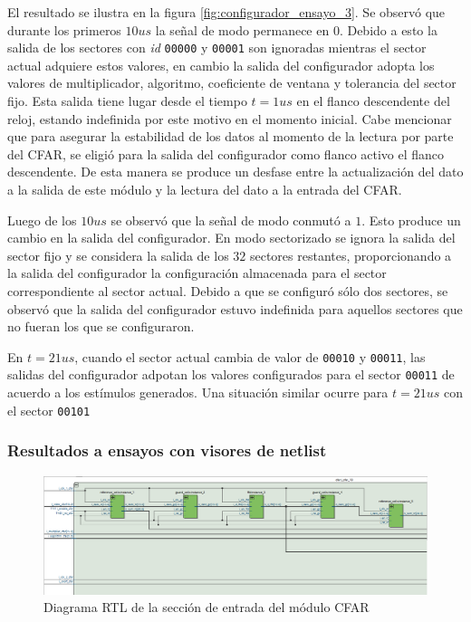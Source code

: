 El resultado se ilustra en la figura \ref{fig:configurador_ensayo_3}. Se observó que durante los primeros $10 us$ la señal de modo permanece en $0$. Debido a esto la salida de los sectores con \textit{id} \texttt{00000} y \texttt{00001} son ignoradas mientras el sector actual adquiere estos valores, en cambio la salida del configurador adopta los valores de multiplicador, algoritmo, coeficiente de ventana y tolerancia del sector fijo. Esta salida tiene lugar desde el tiempo $t = 1 us$ en el flanco descendente del reloj, estando indefinida por este motivo en el momento inicial. Cabe mencionar que para asegurar la estabilidad de los datos al momento de la lectura por parte del CFAR, se eligió para la salida del configurador como flanco activo el flanco descendente. De esta manera se produce un desfase entre la actualización del dato a la salida de este módulo y la lectura del dato a la entrada del CFAR.

Luego de los $10 us$ se observó que la señal de modo conmutó a $1$. Esto produce un cambio en la salida del configurador. En modo sectorizado se ignora la salida del sector fijo y se considera la salida de los $32$ sectores restantes, proporcionando a la salida del configurador la configuración almacenada para el sector correspondiente al sector actual. Debido a que se configuró sólo dos sectores, se observó que la salida del configurador estuvo indefinida para aquellos sectores que no fueran los que se configuraron.

En $t = 21 us$, cuando el sector actual cambia de valor de \texttt{00010} y \texttt{00011}, las salidas del configurador adpotan los valores configurados para el sector \texttt{00011} de acuerdo a los estímulos generados. Una situación similar ocurre para $t = 21 us$ con el sector \texttt{00101}



\subsubsection{Resultados a ensayos con visores de netlist}
\label{Subsec: Resultados de Visores de netlist}

\begin{figure}
\centering
\includegraphics[scale=0.6, angle=270]{./Figures/RTL_cfar_1.png}
\caption{Diagrama RTL de la sección de entrada del módulo CFAR}
\label{fig:RTL_cfar_1}
\end{figure}



